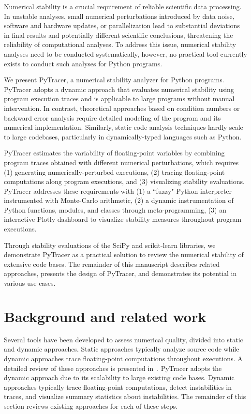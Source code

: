 \documentclass[11pt]{article}
\newcommand{\pytracer}[0]{PyTracer\xspace}
\begin{document}
Numerical stability is a crucial requirement of reliable scientific data
processing. In unstable analyses, small numerical perturbations introduced by data noise, software and hardware updates, or parallelization lead to substantial deviations in final results and potentially different scientific conclusions, threatening the reliability of computational analyses. To address this issue, numerical stability analyses need to be conducted systematically, however, no practical tool currently exists to conduct such analyses for Python programs.

We present PyTracer, a numerical stability analyzer for Python programs.
PyTracer adopts a dynamic approach that evaluates numerical stability using program execution traces and is applicable to large programs without manual intervention. In contrast, theoretical approaches based on condition numbers or backward error analysis require detailed modeling of the program and its numerical implementation. Similarly, static code analysis techniques hardly scale to large codebases, particularly in dynamically-typed languages such as Python.

PyTracer estimates the variability of floating-point variables by combining program traces obtained with different numerical perturbations, which requires (1) generating numerically-perturbed executions, (2) tracing floating-point computations along program executions, and (3) visualizing stability evaluations. PyTracer addresses these requirements with (1) a ``fuzzy" Python interpreter instrumented with Monte-Carlo arithmetic, (2) a dynamic instrumentation of Python functions, modules, and classes through meta-programming, (3) an interactive Plotly dashboard to visualize stability measures throughout program executions.

Through stability evaluations of the
SciPy and scikit-learn libraries, we demonstrate \pytracer as a practical solution to review the numerical stability of extensive code bases. The remainder of this manuscript describes related approaches, presents the design of \pytracer, and demonstrates its potential in various use cases.


\section{Background and related work}

Several tools have been developed to assess numerical quality, divided into static and dynamic approaches. Static approaches typically analyze source code while dynamic approaches trace floating-point computations throughout executions. A detailed review of these approaches is presented in~\cite{cherubin2020tools}. 
\pytracer adopts the dynamic approach due to its scalability to large existing code bases. Dynamic approaches typically trace floating-point computations, detect instabilities in traces, and visualize summary statistics about instabilities. The remainder of this section reviews existing approaches for each of these steps. 
\end{document}
